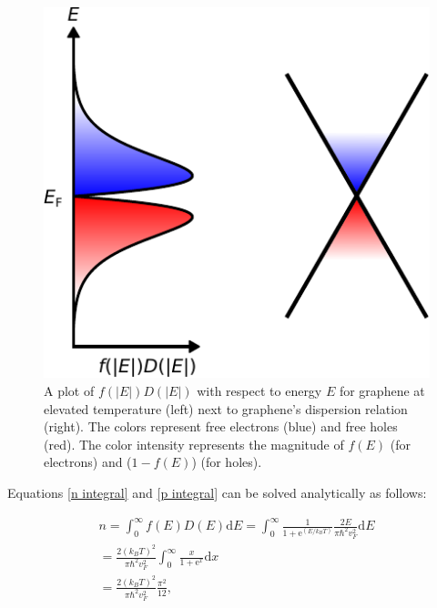 \documentclass[double,12pt,1in]{beavtex}
\begin{document}
\begin{figure}
    \includegraphics{graphene theory 3.pdf}
    \caption{A plot of $f(|E|)D(|E|)$ with respect to energy $E$ for graphene at elevated temperature (left) next to graphene's dispersion relation (right). The colors represent free electrons (blue) and free holes (red). The color intensity represents the magnitude of $f(E)$ (for electrons) and ($1-f(E)$) (for holes).}
    \label{graphene at elevated T plot}
\end{figure}
Equations \ref{n integral} and \ref{p integral} can be solved analytically as follows:

\begin{equation}
    \begin{split}
        n = \int_{0}^{\infty}f(E) D(E)\mathrm{d}E 
        = \int_{0}^{\infty}\frac{1}{1+\mathrm{e}^{(E/k_B T)}} \frac{2E}{\pi \hbar^2 v_F^2}\mathrm{d}E \\
        = \frac{2(k_B T)^2}{\pi \hbar^2 v_F^2}\int_{0}^{\infty}\frac{x}{1+\mathrm{e}^{x}}\mathrm{d}x \\
        = \frac{2(k_B T)^2}{\pi\hbar^2 v_F^2} \frac{\pi^2}{12}, \label{n density}
    \end{split}
\end{equation}
\end{document}
